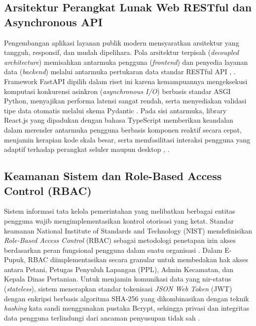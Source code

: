\documentclass[conference]{IEEEtran}
\begin{document}
\subsection{Arsitektur Perangkat Lunak Web RESTful dan Asynchronous API}
Pengembangan aplikasi layanan publik modern mensyaratkan arsitektur yang tangguh, responsif, dan mudah dipelihara. Pola arsitektur terpisah (\textit{decoupled architecture}) memisahkan antarmuka pengguna (\textit{frontend}) dan penyedia layanan data (\textit{backend}) melalui antarmuka pertukaran data standar RESTful API \cite{b8}, \cite{b9}. Framework FastAPI dipilih dalam riset ini karena kemampuannya mengeksekusi komputasi konkurensi asinkron (\textit{asynchronous I/O}) berbasis standar ASGI Python, menyajikan performa latensi sangat rendah, serta menyediakan validasi tipe data otomatis melalui skema Pydantic \cite{b8}. Pada sisi antarmuka, library React.js yang dipadukan dengan bahasa TypeScript memberikan keandalan dalam merender antarmuka pengguna berbasis komponen reaktif secara cepat, menjamin kerapian kode skala besar, serta memfasilitasi interaksi pengguna yang adaptif terhadap perangkat seluler maupun desktop \cite{b9}, \cite{b15}.

\subsection{Keamanan Sistem dan Role-Based Access Control (RBAC)}
Sistem informasi tata kelola pemerintahan yang melibatkan berbagai entitas pengguna wajib mengimplementasikan kontrol otorisasi yang ketat. Standar keamanan National Institute of Standards and Technology (NIST) mendefinisikan \textit{Role-Based Access Control} (RBAC) sebagai metodologi penetapan izin akses berdasarkan peran fungsional pengguna dalam suatu organisasi \cite{b10}. Dalam E-Pupuk, RBAC diimplementasikan secara granular untuk membedakan hak akses antara Petani, Petugas Penyuluh Lapangan (PPL), Admin Kecamatan, dan Kepala Dinas Pertanian. Untuk menjamin komunikasi data yang nir-status (\textit{stateless}), sistem menerapkan standar tokenisasi \textit{JSON Web Token} (JWT) dengan enkripsi berbasis algoritma SHA-256 yang dikombinasikan dengan teknik \textit{hashing} kata sandi menggunakan pustaka Bcrypt, sehingga privasi dan integritas data pengguna terlindungi dari ancaman penyusupan tidak sah \cite{b11}.
\end{document}
